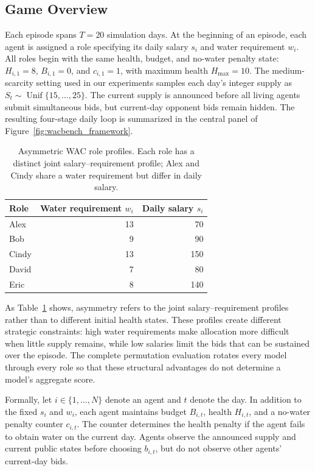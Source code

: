 \documentclass[letterpaper]{article} %
\begin{document}
\subsection{Game Overview}

Each episode spans $T=20$ simulation days. At the beginning of an
episode, each agent is assigned a role specifying its daily salary $s_i$
and water requirement $w_i$. All roles begin with the same health,
budget, and no-water penalty state: $H_{i,1}=8$, $B_{i,1}=0$, and
$c_{i,1}=1$, with maximum health $H_{\max}=10$. The medium-scarcity
setting used in our experiments samples each day's integer supply as
$S_t\sim\operatorname{Unif}\{15,\ldots,25\}$. The current supply is
announced before all living agents submit simultaneous bids, but
current-day opponent bids remain hidden. The resulting four-stage daily loop
is summarized in the central panel of Figure~\ref{fig:wacbench_framework}.

\begin{table}[t]
    \centering
    \small
    \setlength{\tabcolsep}{9pt}
    \caption{Asymmetric WAC role profiles. Each role has a distinct joint
    salary--requirement profile; Alex and Cindy share a water requirement
    but differ in daily salary.}
    \label{tab:role-profiles}
    \begin{tabular}{lrr}
        \toprule
        Role & Water requirement $w_i$ & Daily salary $s_i$ \\
        \midrule
        Alex  & 13 & 70  \\
        Bob   & 9  & 90  \\
        Cindy & 13 & 150 \\
        David & 7  & 80  \\
        Eric  & 8  & 140 \\
        \bottomrule
    \end{tabular}
\end{table}

As Table~\ref{tab:role-profiles} shows, asymmetry refers to the joint
salary--requirement profiles rather than to different initial health
states. These profiles create different strategic constraints: high water
requirements make allocation more difficult when little supply remains,
while low salaries limit the bids that can be sustained over the episode.
The complete permutation evaluation rotates every model through every role
so that these structural advantages do not determine a model's aggregate
score.

Formally, let $i \in \{1,\ldots,N\}$ denote an agent and $t$ denote the
day. In addition to the fixed $s_i$ and $w_i$, each agent maintains budget
$B_{i,t}$, health $H_{i,t}$, and a no-water penalty counter $c_{i,t}$. The
counter determines the health penalty if the agent fails to obtain water
on the current day. Agents observe the announced supply and current public
states before choosing $b_{i,t}$, but do not observe other agents'
current-day bids.
\end{document}
